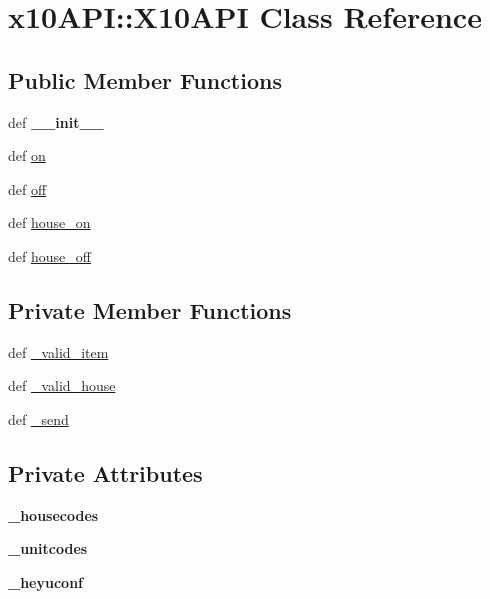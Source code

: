 \hypertarget{classx10API_1_1X10API}{
\section{x10API::X10API Class Reference}
\label{classx10API_1_1X10API}
}
\subsection*{Public Member Functions}
\begin{CompactItemize}
\item 
\hypertarget{classx10API_1_1X10API_df1708474fd2eda336c665c64067a648}{
def \textbf{\_\-\_\-init\_\-\_\-}}
\label{classx10API_1_1X10API_df1708474fd2eda336c665c64067a648}

\item 
def \hyperlink{classx10API_1_1X10API_b23095bb54aa45e75857beaa59a7deed}{on}
\item 
def \hyperlink{classx10API_1_1X10API_37be53c20aaa39f5770a5085b80984bc}{off}
\item 
def \hyperlink{classx10API_1_1X10API_d1e63a9dd573eb16a7d1009c72fac15e}{house\_\-on}
\item 
def \hyperlink{classx10API_1_1X10API_b04c7647aa5d80c462f0df36afaff4ec}{house\_\-off}
\end{CompactItemize}
\subsection*{Private Member Functions}
\begin{CompactItemize}
\item 
def \hyperlink{classx10API_1_1X10API_398d98e0674a6cefaef1154eafe94a15}{\_\-valid\_\-item}
\item 
def \hyperlink{classx10API_1_1X10API_e9639dcec52e0f507fcc224a6c377c7d}{\_\-valid\_\-house}
\item 
def \hyperlink{classx10API_1_1X10API_268f590bc14835490b1ea823c86e4dcb}{\_\-send}
\end{CompactItemize}
\subsection*{Private Attributes}
\begin{CompactItemize}
\item 
\hypertarget{classx10API_1_1X10API_e2bc653247758e1a67d8b8ac5b0d3611}{
\textbf{\_\-housecodes}}
\label{classx10API_1_1X10API_e2bc653247758e1a67d8b8ac5b0d3611}

\item 
\hypertarget{classx10API_1_1X10API_d2d5e02d43d6d4d1b0eba44248d29bb5}{
\textbf{\_\-unitcodes}}
\label{classx10API_1_1X10API_d2d5e02d43d6d4d1b0eba44248d29bb5}

\item 
\hypertarget{classx10API_1_1X10API_e11abda6663c0ad8d5e63d6abd52d562}{
\textbf{\_\-heyuconf}}
\label{classx10API_1_1X10API_e11abda6663c0ad8d5e63d6abd52d562}

\end{CompactItemize}


